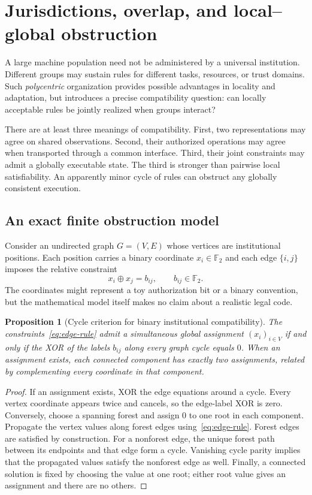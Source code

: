 \documentclass[11pt,letterpaper]{article}
\theoremstyle{plain}
\newtheorem{proposition}{Proposition}[section]
\theoremstyle{definition}
\theoremstyle{remark}
\begin{document}
\section{Jurisdictions, overlap, and local--global obstruction}\label{sec:jurisdictions}

A large machine population need not be administered by a universal institution. Different groups may sustain rules for different tasks, resources, or trust domains. Such \emph{polycentric} organization provides possible advantages in locality and adaptation, but introduces a precise compatibility question: can locally acceptable rules be jointly realized when groups interact?

There are at least three meanings of compatibility. First, two representations may agree on shared observations. Second, their authorized operations may agree when transported through a common interface. Third, their joint constraints may admit a globally executable state. The third is stronger than pairwise local satisfiability. An apparently minor cycle of rules can obstruct any globally consistent execution.

\subsection{An exact finite obstruction model}

Consider an undirected graph $G=(V,E)$ whose vertices are institutional positions. Each position carries a binary coordinate $x_i\in\mathbb F_2$ and each edge $\{i,j\}$ imposes the relative constraint
\begin{equation}\label{eq:edge-rule}
x_i\oplus x_j=b_{ij},\qquad b_{ij}\in\mathbb F_2.
\end{equation}
The coordinates might represent a toy authorization bit or a binary convention, but the mathematical model itself makes no claim about a realistic legal code.

\begin{proposition}[Cycle criterion for binary institutional compatibility]\label{prop:cycle}
The constraints~\eqref{eq:edge-rule} admit a simultaneous global assignment $(x_i)_{i\in V}$ if and only if the XOR of the labels $b_{ij}$ along every graph cycle equals $0$. When an assignment exists, each connected component has exactly two assignments, related by complementing every coordinate in that component.
\end{proposition}
\begin{proof}
If an assignment exists, XOR the edge equations around a cycle. Every vertex coordinate appears twice and cancels, so the edge-label XOR is zero. Conversely, choose a spanning forest and assign $0$ to one root in each component. Propagate the vertex values along forest edges using~\eqref{eq:edge-rule}. Forest edges are satisfied by construction. For a nonforest edge, the unique forest path between its endpoints and that edge form a cycle. Vanishing cycle parity implies that the propagated values satisfy the nonforest edge as well. Finally, a connected solution is fixed by choosing the value at one root; either root value gives an assignment and there are no others.
\end{proof}
\end{document}
